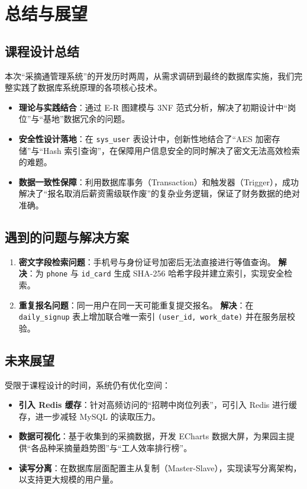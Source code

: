 \documentclass[UTF8,a4paper,12pt]{article}
\begin{document}
\section{总结与展望}

\subsection{课程设计总结}
本次“采摘通管理系统”的开发历时两周，从需求调研到最终的数据库实施，我们完整实践了数据库系统原理的各项核心技术。

\begin{itemize}
    \item \textbf{理论与实践结合}：通过 E-R 图建模与 3NF 范式分析，解决了初期设计中“岗位”与“基地”数据冗余的问题。
    \item \textbf{安全性设计落地}：在 \texttt{sys\_user} 表设计中，创新性地结合了“AES 加密存储”与“Hash 索引查询”，在保障用户信息安全的同时解决了密文无法高效检索的难题。
    \item \textbf{数据一致性保障}：利用数据库事务（Transaction）和触发器（Trigger），成功解决了“报名取消后薪资需级联作废”的复杂业务逻辑，保证了财务数据的绝对准确。
\end{itemize}

\subsection{遇到的问题与解决方案}
\begin{enumerate}
    \item \textbf{密文字段检索问题}：手机号与身份证号加密后无法直接进行等值查询。
    \textbf{解决}：为 \texttt{phone} 与 \texttt{id\_card} 生成 SHA-256 哈希字段并建立索引，实现安全检索。
    \item \textbf{重复报名问题}：同一用户在同一天可能重复提交报名。
    \textbf{解决}：在 \texttt{daily\_signup} 表上增加联合唯一索引 \texttt{(user\_id, work\_date)} 并在服务层校验。
\end{enumerate}

\subsection{未来展望}
受限于课程设计的时间，系统仍有优化空间：
\begin{itemize}
    \item \textbf{引入 Redis 缓存}：针对高频访问的“招聘中岗位列表”，可引入 Redis 进行缓存，进一步减轻 MySQL 的读取压力。
    \item \textbf{数据可视化}：基于收集到的采摘数据，开发 ECharts 数据大屏，为果园主提供“各品种采摘量趋势图”与“工人效率排行榜”。
    \item \textbf{读写分离}：在数据库层面配置主从复制（Master-Slave），实现读写分离架构，以支持更大规模的用户量。
\end{itemize}
\end{document}
